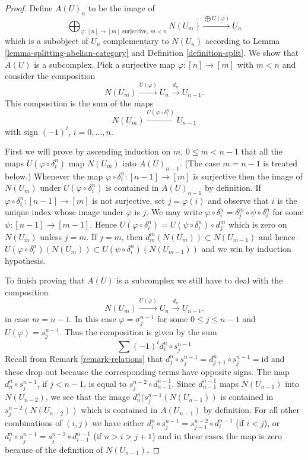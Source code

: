 \begin{proof}
Define $A(U)_n$ to be the image of
$$
\bigoplus\nolimits_{\varphi : [n] \to [m]\text{ surjective}, \ m < n} N(U_m)
\xrightarrow{\bigoplus U(\varphi)}
U_n
$$
which is a subobject of $U_n$ complementary to
$N(U_n)$ according to Lemma \ref{lemma-splitting-abelian-category} and
Definition \ref{definition-split}. We show that
$A(U)$ is a subcomplex. Pick a surjective
map $\varphi : [n] \to [m]$ with $m < n$ and consider
the composition
$$
N(U_m) \xrightarrow{U(\varphi)} U_n \xrightarrow{d_n} U_{n - 1}.
$$
This composition is the sum of the maps
$$
N(U_m) \xrightarrow{U(\varphi \circ \delta^n_i)} U_{n - 1}
$$
with sign $(-1)^i$, $i = 0, \ldots, n$.

\medskip\noindent
First we will prove by ascending induction on $m$,
$0 \leq m < n - 1$ that all the maps $U(\varphi \circ \delta^n_i)$
map $N(U_m)$ into $A(U)_{n - 1}$. (The case $m = n - 1$ is treated below.)
Whenever the map $\varphi \circ \delta^n_i : [n - 1] \to [m]$
is surjective then the image of $N(U_m)$ under $U(\varphi \circ \delta^n_i)$
is contained in $A(U)_{n - 1}$ by definition.
If $\varphi \circ \delta^n_i : [n - 1] \to [m]$ is not surjective,
set $j = \varphi(i)$ and observe that $i$ is the unique
index whose image under $\varphi$ is $j$. We may write
$\varphi \circ \delta^n_i = \delta^m_j \circ \psi \circ \delta^n_i$
for some $\psi : [n - 1] \to [m - 1]$. Hence
$U(\varphi \circ \delta^n_i) = U(\psi \circ \delta^n_i) \circ d^m_j$ which
is zero on $N(U_m)$ unless $j = m$. If $j = m$, then
$d^m_m(N(U_m)) \subset N(U_{m - 1})$ and hence
$U(\varphi \circ \delta^n_i)(N(U_m)) \subset
U(\psi \circ \delta^n_i)(N(U_{m - 1}))$ and we win
by induction hypothesis.

\medskip\noindent
To finish proving that $A(U)$ is a subcomplex
we still have to deal with the composition
$$
N(U_m) \xrightarrow{U(\varphi)} U_n \xrightarrow{d_n} U_{n - 1}.
$$
in case $m =  n - 1$. In this case $\varphi = \sigma^{n - 1}_j$
for some $0 \leq j \leq n - 1$ and $U(\varphi) = s^{n - 1}_j$.
Thus the composition is given by the sum
$$
\sum (-1)^i d^n_i \circ s^{n - 1}_j
$$
Recall from Remark \ref{remark-relations} that
$d^n_j \circ s^{n - 1}_j = d^n_{j + 1} \circ s^{n - 1}_j = \text{id}$
and these drop out because the corresponding terms have opposite signs.
The map $d^n_n \circ s^{n - 1}_j$, if $j < n - 1$, is equal to
$s^{n - 2}_j \circ d^{n - 1}_{n - 1}$. Since
$d^{n - 1}_{n - 1}$ maps $N(U_{n - 1})$ into $N(U_{n - 2})$,
we see that the image $d^n_n ( s^{n - 1}_j (N(U_{n - 1}))$
is contained in $s^{n - 2}_j(N(U_{n - 2}))$ which
is contained in $A(U_{n - 1})$ by definition. For all
other combinations of $(i, j)$ we have
either $d^n_i \circ s^{n - 1}_j = s^{n - 2}_{j - 1} \circ d^{n - 1}_i$
(if $i < j$), or
$d^n_i \circ s^{n - 1}_j = s^{n - 2}_j \circ d^{n - 1}_{i - 1}$
(if $n > i > j + 1$) and in these cases the map is zero because
of the definition of $N(U_{n - 1})$.
\end{proof}


